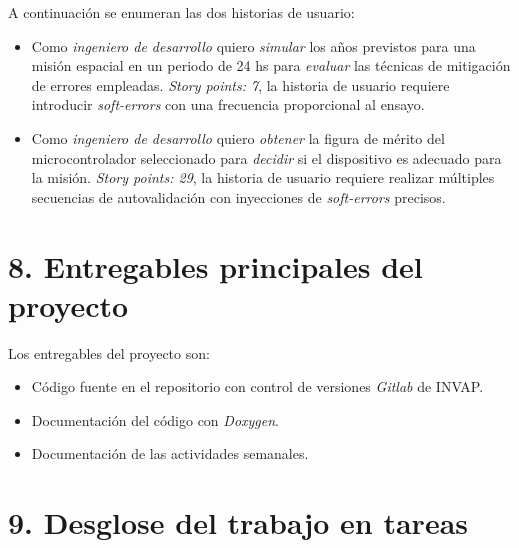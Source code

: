\documentclass[
11pt, %
]{charter}
\begin{document}
A continuación se enumeran las dos historias de usuario:

\begin{itemize}
	\item Como \emph{ingeniero de desarrollo} quiero \emph{simular} los años previstos para una misión espacial en un periodo de 24 hs para \emph{evaluar} las técnicas de mitigación de errores empleadas. \emph{Story points: 7}, la historia de usuario requiere introducir \emph{soft-errors} con una frecuencia proporcional al ensayo.
	\item Como \emph{ingeniero de desarrollo} quiero \emph{obtener} la figura de mérito del microcontrolador seleccionado para \emph{decidir} si el dispositivo es adecuado para la misión. \emph{Story points: 29}, la historia de usuario requiere realizar múltiples secuencias de autovalidación con inyecciones de \emph{soft-errors} precisos.
\end{itemize}


\section{8. Entregables principales del proyecto}
\label{sec:entregables}

Los entregables del proyecto son:

\begin{itemize}
	\item Código fuente en el repositorio con control de versiones \emph{Gitlab} de INVAP.
	\item Documentación del código con \emph{Doxygen}.
	\item Documentación de las actividades semanales.
\end{itemize}


\section{9. Desglose del trabajo en tareas}
\label{sec:wbs}
\end{document}
